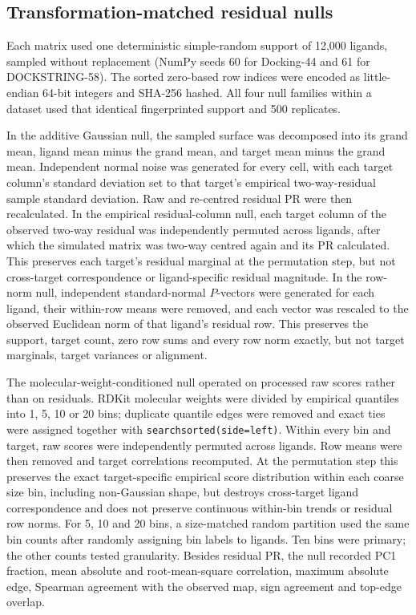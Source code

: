 \subsection{Transformation-matched residual nulls}

Each matrix used one deterministic simple-random support of 12,000 ligands,
sampled without replacement (NumPy seeds 60 for Docking-44 and 61 for
DOCKSTRING-58).  The sorted zero-based row indices were encoded as little-endian
64-bit integers and SHA-256 hashed.  All four null families within a dataset
used that identical fingerprinted support and 500 replicates.

In the additive Gaussian null, the sampled surface was decomposed into its
grand mean, ligand mean minus the grand mean, and target mean minus the grand
mean.  Independent normal noise was generated for every cell, with each target
column's standard deviation set to that target's empirical two-way-residual
sample standard deviation.  Raw and re-centred residual PR were then
recalculated.  In the empirical residual-column null, each target column of the
observed two-way residual was independently permuted across ligands, after
which the simulated matrix was two-way centred again and its PR calculated.
This preserves each target's residual marginal at the permutation step, but not
cross-target correspondence or ligand-specific residual magnitude.  In the
row-norm null, independent standard-normal $P$-vectors were generated for each
ligand, their within-row means were removed, and each vector was rescaled to
the observed Euclidean norm of that ligand's residual row.  This preserves the
support, target count, zero row sums and every row norm exactly, but not target
marginals, target variances or alignment.

The molecular-weight-conditioned null operated on processed raw scores rather
than on residuals.  RDKit molecular weights were divided by empirical quantiles
into 1, 5, 10 or 20 bins; duplicate quantile edges were removed and exact ties
were assigned together with \texttt{searchsorted(side=left)}.  Within every bin
and target, raw scores were independently permuted across ligands.  Row means
were then removed and target correlations recomputed.  At the permutation step
this preserves the exact target-specific empirical score distribution within
each coarse size bin, including non-Gaussian shape, but destroys cross-target
ligand correspondence and does not preserve continuous within-bin trends or
residual row norms.  For 5, 10 and 20 bins, a size-matched random partition
used the same bin counts after randomly assigning bin labels to ligands.  Ten
bins were primary; the other counts tested granularity.  Besides residual PR,
the null recorded PC1 fraction, mean absolute and root-mean-square correlation,
maximum absolute edge, Spearman agreement with the observed map, sign agreement
and top-edge overlap.

